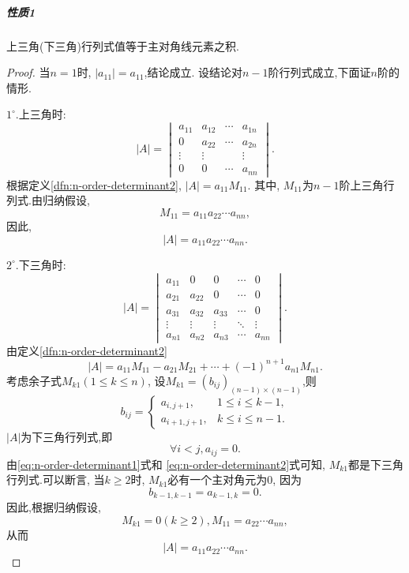 \subparagraph{\color{ecolor}性质1}
上三角(下三角)行列式值等于主对角线元素之积.

\begin{proof}
  当$n=1$时, $|a_{11}|=a_{11}$,结论成立.
  设结论对$n-1$阶行列式成立,下面证$n$阶的情形.

  $1^{\circ}.$上三角时:
  \[
    |A|=
    \begin{vmatrix}
      a_{11}&a_{12}&\cdots&a_{1n}\\
      0&a_{22}&\cdots&a_{2n}\\
      \vdots&\vdots&&\vdots\\
      0&0&\cdots&a_{nn}
    \end{vmatrix}.
  \]
  根据定义\ref{dfn:n-order-determinant2}, $|A|=a_{11}M_{11}$.
  其中, $M_{11}$为$n-1$阶上三角行列式.由归纳假设,
  \[
    M_{11}=a_{11}a_{22}\cdots a_{nn},
  \]
  因此,
  \[
    |A|=a_{11}a_{22}\cdots a_{nn}.
  \]

  $2^{\circ}.$下三角时:
  \[
    |A|=
    \begin{vmatrix}
      a_{11}&0&0&\cdots&0\\
      a_{21}&a_{22}&0&\cdots&0\\
      a_{31}&a_{32}&a_{33}&\cdots&0\\
      \vdots&\vdots&\vdots&\ddots&\vdots\\
      a_{n1}&a_{n2}&a_{n3}&\cdots&a_{nn}
    \end{vmatrix}.
  \]
  由定义\ref{dfn:n-order-determinant2}
  \[
    |A|=a_{11}M_{11}-a_{21}M_{21}+\cdots +(-1)^{n+1}a_{n1}M_{n1}.
  \]
  考虑余子式$M_{k1}(1\leq k \leq n)$,
  设$M_{k1}=(b_{ij})_{(n-1)\times (n-1)}$,则
  \begin{equation}\label{eq:n-order-determinant1}
    b_{ij}=
    \begin{cases}
      a_{i,j+1}, & 1\leq i \leq k-1,\\
      a_{i+1,j+1}, & k\leq i \leq n-1.
    \end{cases}
  \end{equation}
  $|A|$为下三角行列式,即
  \begin{equation}
    \label{eq:n-order-determinant2}
    \forall i<j, a_{ij}=0.
  \end{equation}
  由\eqref{eq:n-order-determinant1}式和
  \eqref{eq:n-order-determinant2}式可知,
  $M_{k1}$都是下三角行列式.可以断言,
  当$k\geq 2$时, $M_{k1}$必有一个主对角元为$0$,
  因为
  \[
    b_{k-1,k-1}=a_{k-1,k}=0.
  \]
  因此,根据归纳假设,
  \[
    M_{k1}=0(k\geq 2), M_{11}=a_{22}\cdots a_{nn},
  \]
  从而
  \[
    |A|=a_{11}a_{22}\cdots a_{nn}.    
  \]
\end{proof}

